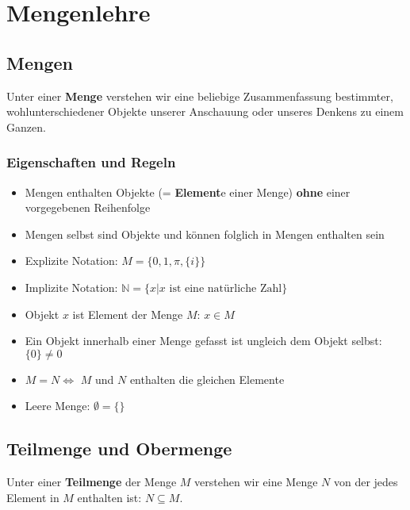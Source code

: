 \documentclass[../../main.tex]{subfiles}
\begin{document}
	\chapter{Mengenlehre}

	\section{Mengen}
	
	\begin{definition}
		\label{def:Menge}
		\label{def:Element}
		Unter einer \textbf{Menge} verstehen wir eine beliebige Zusammenfassung bestimmter, wohlunterschiedener Objekte unserer Anschauung oder unseres Denkens zu einem Ganzen. 
	\end{definition}

	\subsection*{Eigenschaften und Regeln}
	\begin{itemize}
		\item Mengen enthalten Objekte (= \textbf{Element}e einer Menge) \textbf{ohne} einer vorgegebenen Reihenfolge
		\item Mengen selbst sind Objekte und können folglich in Mengen enthalten sein
		\item Explizite Notation: $M = \{0, 1, \pi, \{i\}\}$
		\item Implizite Notation: $\mathbb{N} = \{x|x \textrm{ ist eine natürliche Zahl}\}$
		\item Objekt $x$ ist Element der Menge $M$: $x \in M$
		\item Ein Objekt innerhalb einer Menge gefasst ist ungleich dem Objekt selbst: $\{0\} \not= 0$
		\item $M = N \Leftrightarrow$ $M$ und $N$ enthalten die gleichen Elemente 
		\item Leere Menge: $\emptyset = \{\}$ 
	\end{itemize}



	\section{Teilmenge und Obermenge}

	\begin{definition}[Teilmenge]
		\label{def:Teilmenge}
		Unter einer \textbf{Teilmenge} der Menge $M$ verstehen wir eine Menge $N$ von der jedes Element in $M$ enthalten ist: $N \subseteq M$.
	\end{definition}
\end{document}
